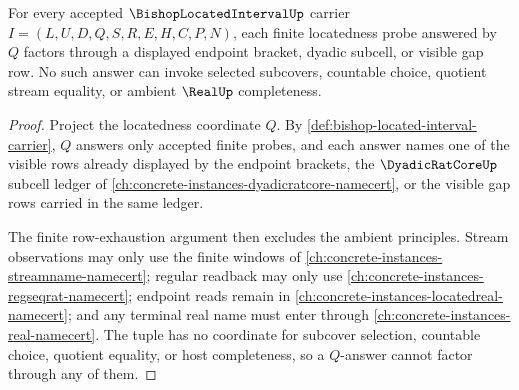 \begin{theorem}
\label{thm:bishop-located-interval-locatedness-witness}
For every accepted $\BishopLocatedIntervalUp$ carrier $I=(L,U,D,Q,S,R,E,H,C,P,N)$, each finite locatedness probe answered by $Q$ factors through a displayed endpoint bracket, dyadic subcell, or visible gap row. No such answer can invoke selected subcovers, countable choice, quotient stream equality, or ambient $\RealUp$ completeness.
\end{theorem}
\begin{proof}
Project the locatedness coordinate $Q$. By \autoref{def:bishop-located-interval-carrier}, $Q$ answers only accepted finite probes, and each answer names one of the visible rows already displayed by the endpoint brackets, the $\DyadicRatCoreUp$ subcell ledger of \autoref{ch:concrete-instances-dyadicratcore-namecert}, or the visible gap rows carried in the same ledger.

The finite row-exhaustion argument then excludes the ambient principles. Stream observations may only use the finite windows of \autoref{ch:concrete-instances-streamname-namecert}; regular readback may only use \autoref{ch:concrete-instances-regseqrat-namecert}; endpoint reads remain in \autoref{ch:concrete-instances-locatedreal-namecert}; and any terminal real name must enter through \autoref{ch:concrete-instances-real-namecert}. The tuple has no coordinate for subcover selection, countable choice, quotient equality, or host completeness, so a $Q$-answer cannot factor through any of them.
\end{proof}

